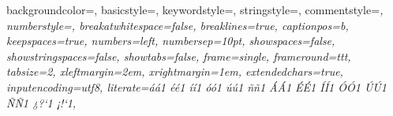  {
  backgroundcolor=\color{bgCodeColor},
  basicstyle=\ttfamily\small\color{black},
  keywordstyle=\color{kwColor},
  stringstyle=\color{stringColor},
  commentstyle=\color{codeGray}\itshape,
  numberstyle=\tiny\color{black},
  breakatwhitespace=false,
  breaklines=true,
  captionpos=b,
  keepspaces=true,
  numbers=left,
  numbersep=10pt,
  showspaces=false,
  showstringspaces=false,
  showtabs=false,
  frame=single,
  frameround=ttt,
  tabsize=2,
  xleftmargin=2em,
  xrightmargin=1em,
  extendedchars=true,
  inputencoding=utf8,
  literate={á}{{\'a}}1 {é}{{\'e}}1 {í}{{\'i}}1 {ó}{{\'o}}1 {ú}{{\'u}}1
           {ñ}{{\~n}}1 {Á}{{\'A}}1 {É}{{\'E}}1 {Í}{{\'I}}1 {Ó}{{\'O}}1
           {Ú}{{\'U}}1 {Ñ}{{\~N}}1 {¿}{{?`}}1 {¡}{{!`}}1,
}
\lstset{style=codeSnippet}
\renewcommand{\lstlistingname}{\USAL@listing}
\renewcommand{\lstlistlistingname}{\USAL@listoflistings}


\RequirePackage{pgfgantt}
\ifx\usal@language\usal@spanishname
  \def\pgfcalendarmonthshortname#1{\ifcase#1\or ene\or feb\or mar\or abr\or may\or jun\or jul\or ago\or sep\or oct\or nov\or dic\fi}
  \def\pgfcalendarmonthname#1{\ifcase#1\or enero\or febrero\or marzo\or abril\or mayo\or junio\or julio\or agosto\or septiembre\or octubre\or noviembre\or diciembre\fi}
\fi


\RequirePackage{calc}

\renewcommand{\arraystretch}{1.15}

\newcommand{\tb}[1]{\textbf{#1}}

